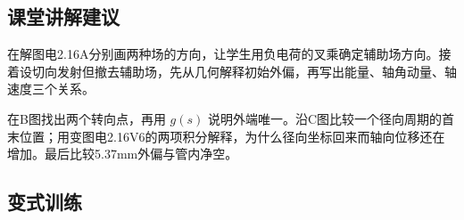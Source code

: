 \documentclass[UTF8,fontset=fandol,a4paper,11pt]{ctexart}
\begin{document}


\subsection*{课堂讲解建议}

在解图电2.16A分别画两种场的方向，让学生用负电荷的叉乘确定辅助场方向。接着设切向发射但撤去辅助场，先从几何解释初始外偏，再写出能量、轴角动量、轴速度三个关系。

在B图找出两个转向点，再用 $g(s)$ 说明外端唯一。沿C图比较一个径向周期的首末位置；用变图电2.16V6的两项积分解释，为什么径向坐标回来而轴向位移还在增加。最后比较5.37mm外偏与管内净空。


\subsection*{变式训练}
\end{document}
